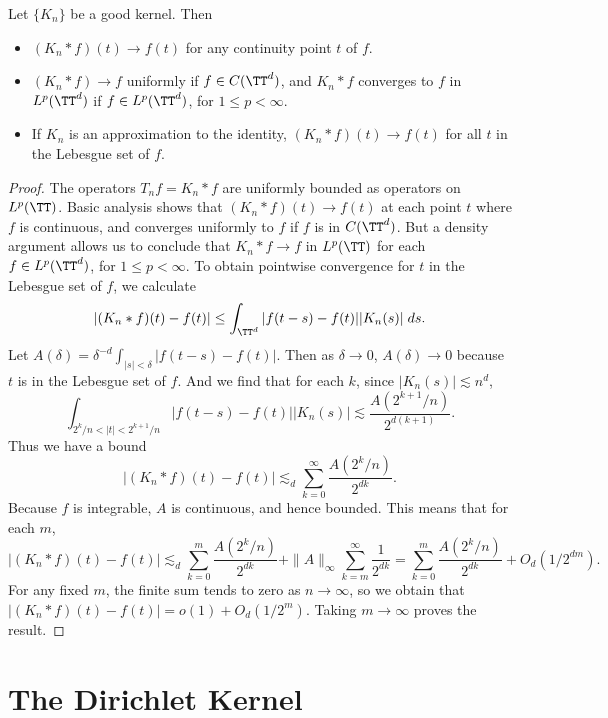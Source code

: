 \begin{theorem}
    Let $\{ K_n \}$ be a good kernel. Then
    \begin{itemize}
        \item $(K_n * f)(t) \to f(t)$ for any continuity point $t$ of $f$.
        \item $(K_n * f) \to f$ uniformly if $f \in C(\TT^d)$, and $K_n * f$ converges to $f$ in $L^p(\TT^d)$ if $f \in L^p(\TT^d)$, for $1 \leq p < \infty$.
        \item If $K_n$ is an approximation to the identity, $(K_n * f)(t) \to f(t)$ for all $t$ in the Lebesgue set of $f$.
    \end{itemize}
\end{theorem}
\begin{proof}
    The operators $T_nf = K_n * f$ are uniformly bounded as operators on $L^p(\TT)$. Basic analysis shows that $(K_n * f)(t) \to f(t)$ at each point $t$ where $f$ is continuous, and converges uniformly to $f$ if $f$ is in $C(\TT^d)$. But a density argument allows us to conclude that $K_n * f \to f$ in $L^p(\TT)$ for each $f \in L^p(\TT^d)$, for $1 \leq p < \infty$. To obtain pointwise convergence for $t$ in the Lebesgue set of $f$, we calculate
    \[ |(K_n * f)(t) - f(t)| \leq \int_{\TT^d} |f(t - s) - f(t)| |K_n(s)|\; ds. \]
    Let $A(\delta) = \delta^{-d} \int_{|s| < \delta} |f(t-s) - f(t)|$. Then as $\delta \to 0$, $A(\delta) \to 0$ because $t$ is in the Lebesgue set of $f$. And we find that for each $k$, since $|K_n(s)| \lesssim n^d$,
    \[ \int_{2^k/n < |t| < 2^{k+1}/n} |f(t-s) - f(t)| |K_n(s)| \lesssim \frac{A(2^{k+1}/n)}{2^{d(k+1)}}. \]
    Thus we have a bound
    \[ |(K_n * f)(t) - f(t)| \lesssim_d \sum_{k = 0}^\infty \frac{A(2^k/n)}{2^{dk}}. \]
    Because $f$ is integrable, $A$ is continuous, and hence bounded. This means that for each $m$,
    \[ |(K_n * f)(t) - f(t)| \lesssim_d \sum_{k = 0}^m \frac{A(2^k/n)}{2^{dk}} + \| A \|_\infty \sum_{k = m}^\infty \frac{1}{2^{dk}} = \sum_{k = 0}^m \frac{A(2^k/n)}{2^{dk}} + O_d\left( 1/2^{dm} \right). \]
    For any fixed $m$, the finite sum tends to zero as $n \to \infty$, so we obtain that $|(K_n * f)(t) - f(t)| = o(1) + O_d(1/2^m)$. Taking $m \to \infty$ proves the result.
\end{proof}

\section{The Dirichlet Kernel}

